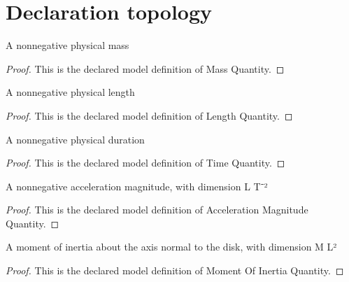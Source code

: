 \section{Declaration topology}
\begin{definition}
  \label{def:physics:phyx-mini-0270:phyxminiproblems-problemphyxmini0270-massquantity}
  A nonnegative physical mass
\end{definition}
\begin{proof}
  This is the declared model definition of Mass Quantity.
\end{proof}
\begin{definition}
  \label{def:physics:phyx-mini-0270:phyxminiproblems-problemphyxmini0270-lengthquantity}
  A nonnegative physical length
\end{definition}
\begin{proof}
  This is the declared model definition of Length Quantity.
\end{proof}
\begin{definition}
  \label{def:physics:phyx-mini-0270:phyxminiproblems-problemphyxmini0270-timequantity}
  A nonnegative physical duration
\end{definition}
\begin{proof}
  This is the declared model definition of Time Quantity.
\end{proof}
\begin{definition}
  \label{def:physics:phyx-mini-0270:phyxminiproblems-problemphyxmini0270-accelerationmagnitudequantity}
  A nonnegative acceleration magnitude, with dimension L T⁻²
\end{definition}
\begin{proof}
  This is the declared model definition of Acceleration Magnitude Quantity.
\end{proof}
\begin{definition}
  \label{def:physics:phyx-mini-0270:phyxminiproblems-problemphyxmini0270-momentofinertiaquantity}
  A moment of inertia about the axis normal to the disk, with dimension M L²
\end{definition}
\begin{proof}
  This is the declared model definition of Moment Of Inertia Quantity.
\end{proof}
